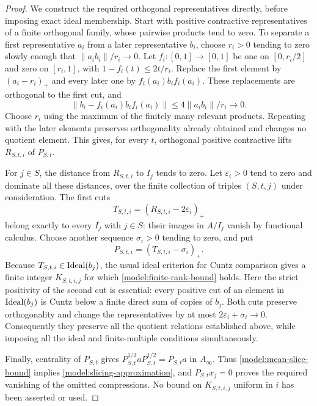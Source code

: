 \begin{proof}
We construct the required orthogonal representatives directly,
before imposing exact ideal membership. Start with positive
contractive representatives of a finite orthogonal family, whose
pairwise products tend to zero.  To separate a first representative
$a_i$ from a later representative $b_i$, choose $r_i>0$ tending to
zero slowly enough that $\|a_ib_i\|/r_i\to0$.  Let
$f_i\colon[0,1]\to[0,1]$ be one on $[0,r_i/2]$ and zero on
$[r_i,1]$, with $1-f_i(t)\leq2t/r_i$.  Replace the first element
by $(a_i-r_i)_+$ and every later one by $f_i(a_i)b_if_i(a_i)$.
These replacements are orthogonal to the first cut, and
\[
 \|b_i-f_i(a_i)b_if_i(a_i)\|
    \leq4\|a_ib_i\|/r_i\longrightarrow0.
\]
Choose $r_i$ using the maximum of the finitely many relevant
products.  Repeating with the later elements preserves
orthogonality already obtained and changes no quotient element.
This gives, for every $t$, orthogonal positive contractive lifts
$R_{S,t,i}$ of $P_{S,t}$.

For $j\in S$, the distance from $R_{S,t,i}$ to $I_j$ tends to zero.
Let $\varepsilon_i>0$ tend to zero and dominate all these distances,
over the finite collection of triples $(S,t,j)$ under
consideration.  The first cuts
\[
 T_{S,t,i}=(R_{S,t,i}-2\varepsilon_i)_+
\]
belong exactly to every $I_j$ with $j\in S$: their images in $A/I_j$
vanish by functional calculus.  Choose another sequence
$\sigma_i>0$ tending to zero, and put
\[
 P_{S,t,i}=(T_{S,t,i}-\sigma_i)_+.
\]
Because $T_{S,t,i}\in\operatorname{Ideal}(b_j)$, the usual ideal criterion for
Cuntz comparison gives a finite integer $K_{S,t,i,j}$ for which
\eqref{model:finite-rank-bound} holds.  Here the strict positivity
of the second cut is essential: every positive cut of an element
in $\operatorname{Ideal}(b_j)$ is Cuntz below a finite direct sum of copies of
$b_j$.  Both cuts preserve orthogonality and change the
representatives by at most $2\varepsilon_i+\sigma_i\to0$.
Consequently they preserve all the quotient relations established
above, while imposing all the ideal and finite-multiple conditions
simultaneously.

Finally, centrality of $P_{S,t}$ gives
$P_{S,t}^{1/2}aP_{S,t}^{1/2}=P_{S,t}a$ in $A_\infty$.
Thus \eqref{model:mean-slice-bound} implies
\eqref{model:slicing-approximation}, and $P_{S,t}x_j=0$ proves the
required vanishing of the omitted compressions.  No bound on
$K_{S,t,i,j}$ uniform in $i$ has been asserted or used.
\end{proof}

